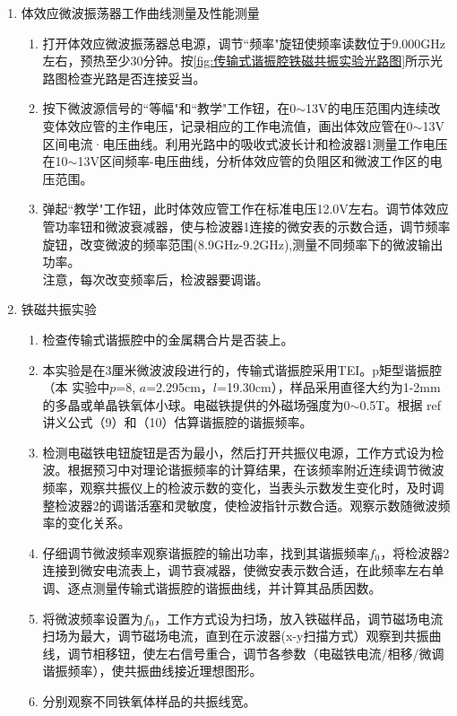 \begin{enumerate}
	\item 体效应微波振荡器工作曲线测量及性能测量
		\begin{enumerate}
			\item 打开体效应微波振荡器总电源，调节“频率"旋钮使频率读数位于9.000GHz 左右，预热至少30分钟。按\cref{fig:传输式谐振腔铁磁共振实验光路图}所示光路图检查光路是否连接妥当。
			\item 按下微波源信号的“等幅"和“教学"工作钮，在0$\sim$13V的电压范围内连续改变体效应管的主作电压，记录相应的工作电流值，画出体效应管在0$\sim$13V区间电流·电压曲线。利用光路中的吸收式波长计和检波器1测量工作电压在10$\sim$13V区间频率-电压曲线，分析体效应管的负阻区和微波工作区的电压范围。
			\item 弹起“教学"工作钮，此时体效应管工作在标准电压12.0V左右。调节体效应管功率钮和微波衰减器，使与检波器1连接的微安表的示数合适，调节频率旋钮，改变微波的频率范围(8.9GHz-9.2GHz),测量不同频率下的微波输出功率。\\
			注意，每次改变频率后，检波器要调谐。
		\end{enumerate}
	\item 铁磁共振实验
		\begin{enumerate}
			\item 检查传输式谐振腔中的金属耦合片是否装上。
			\item 本实验是在3厘米微波波段进行的，传输式谐振腔采用TEI。p矩型谐振腔（本 实验中$p$=8, $a$=2.295cm，$l$=19.30cm），样品采用直径大约为1-2mm的多晶或单晶铁氧体小球。电磁铁提供的外磁场强度为0$\sim$0.5T。根据{\color{red} ref 讲义公式（9）和（10）}估算谐振腔的谐振频率。
			\item 检测电磁铁电钮旋钮是否为最小，然后打开共振仪电源，工作方式设为检波。根据预习中对理论谐振频率的计算结果，在该频率附近连续调节微波频率，观察共振仪上的检波示数的变化，当表头示数发生变化时，及时调整检波器2的调谐活塞和灵敏度，使检波指针示数合适。观察示数随微波频率的变化关系。
			\item 仔细调节微波频率观察谐振腔的输出功率，找到其谐振频率$f_0$，将检波器2连接到微安电流表上，调节衰减器，使微安表示数合适，在此频率左右单调、逐点测量传输式谐振腔的谐振曲线，并计算其品质因数。
			\item 将微波频率设置为$f_0$，工作方式设为扫场，放入铁磁样品，调节磁场电流扫场为最大，调节磁场电流，直到在示波器(x-y扫描方式）观察到共振曲线，调节相移钮，使左右信号重合，调节各参数（电磁铁电流/相移/微调谐振频率），使共振曲线接近理想图形。
			\item 分别观察不同铁氧体样品的共振线宽。
			\begin{enumerate}

\end{enumerate}
\end{enumerate}
\end{enumerate}
